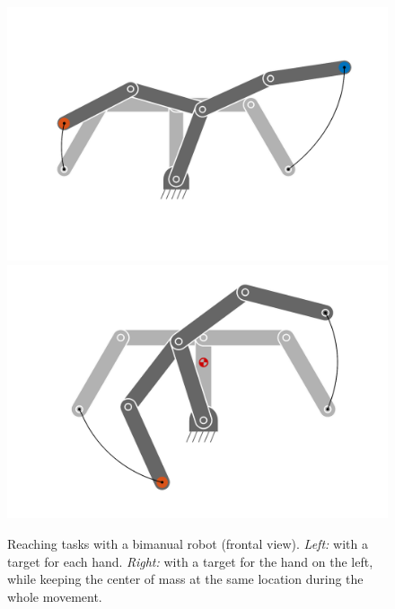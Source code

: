 \documentclass[10pt,a4paper]{article} %
\begin{document}
\begin{figure}%
\centering
\includegraphics[width=.38\columnwidth]{images/iLQR_bimanual02.png}
\includegraphics[width=.38\columnwidth]{images/iLQR_bimanual01.png}
\caption{\footnotesize
Reaching tasks with a bimanual robot (frontal view). \emph{Left:} with a target for each hand. \emph{Right:} with a target for the hand on the left, while keeping the center of mass at the same location during the whole movement.
}
\label{fig:iLQR_bimanual}
\end{figure}

\end{document}
